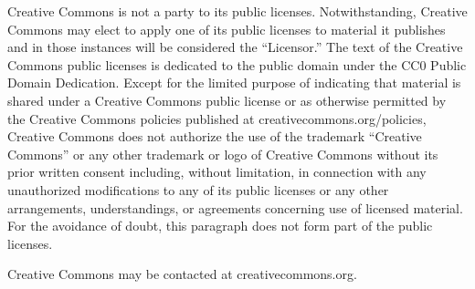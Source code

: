 Creative Commons is not a party to its public licenses. Notwithstanding, Creative Commons may elect to apply one of its public licenses to material it publishes and in those instances will be considered the “Licensor.” The text of the Creative Commons public licenses is dedicated to the public domain under the CC0 Public Domain Dedication. Except for the limited purpose of indicating that material is shared under a Creative Commons public license or as otherwise permitted by the Creative Commons policies published at creativecommons.org/policies, Creative Commons does not authorize the use of the trademark “Creative Commons” or any other trademark or logo of Creative Commons without its prior written consent including, without limitation, in connection with any unauthorized modifications to any of its public licenses or any other arrangements, understandings, or agreements concerning use of licensed material. For the avoidance of doubt, this paragraph does not form part of the public licenses.

Creative Commons may be contacted at creativecommons.org.

